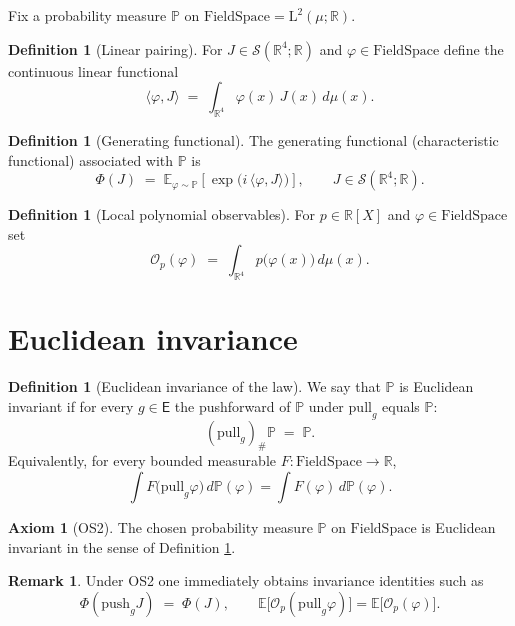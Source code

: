 \documentclass{article}
\newcommand{\R}{\mathbb{R}}
\newcommand{\Rd}{\mathbb{R}^4}
\newcommand{\1}{\mathbbm{1}}
\newcommand{\Sch}{\mathscr{S}}
\newcommand{\LP}{\mathrm{L}}
\newcommand{\push}{\mathrm{push}}
\newcommand{\pull}{\mathrm{pull}}
\newcommand{\Char}{\Phi}
\theoremstyle{plain}
\theoremstyle{definition}
\newtheorem{definition}[theorem]{Definition}
\newtheorem{axiomenv}[theorem]{Axiom}
\newtheorem{remark}[theorem]{Remark}
\numberwithin{equation}{section}
\begin{document}
Fix a probability measure $\mathbb{P}$ on $\mathrm{FieldSpace}=\LP^2(\mu;\R)$.

\begin{definition}[Linear pairing]\label{def:pairing}
For $J\in\Sch(\Rd;\R)$ and $\varphi\in\mathrm{FieldSpace}$ define the continuous linear functional
\[
\langle \varphi, J\rangle
\;=\;\int_{\Rd} \varphi(x)\, J(x)\, d\mu(x).
\]
\end{definition}

\begin{definition}[Generating functional]\label{def:genfun}
The generating functional (characteristic functional) associated with $\mathbb{P}$ is
\[
\Char(J)\;=\;\mathbb{E}_{\varphi\sim\mathbb{P}}\!\left[ \exp\bigl( i \,\langle \varphi, J\rangle \bigr)\right],
\qquad J\in\Sch(\Rd;\R).
\]
\end{definition}

\begin{definition}[Local polynomial observables]\label{def:polyobs}
For $p\in\R[X]$ and $\varphi\in\mathrm{FieldSpace}$ set
\[
\mathcal{O}_p(\varphi)\;=\;\int_{\Rd} p\bigl(\varphi(x)\bigr)\, d\mu(x).
\]
\end{definition}

\section{Euclidean invariance}

\begin{definition}[Euclidean invariance of the law]\label{def:EuclInv}
We say that $\mathbb{P}$ is Euclidean invariant if for every $g\in\mathsf{E}$ the pushforward of $\mathbb{P}$ under $\pull_g$ equals $\mathbb{P}$:
\[
(\pull_g)_\# \mathbb{P} \;=\; \mathbb{P}.
\]
Equivalently, for every bounded measurable $F:\mathrm{FieldSpace}\to\R$,
\[
\int F\bigl(\pull_g \varphi\bigr)\, d\mathbb{P}(\varphi)
= \int F(\varphi)\, d\mathbb{P}(\varphi).
\]
\end{definition}

\begin{axiomenv}[OS2]\label{ax:OS2}
The chosen probability measure $\mathbb{P}$ on $\mathrm{FieldSpace}$ is Euclidean invariant in the sense of Definition \ref{def:EuclInv}.
\end{axiomenv}

\begin{remark}
Under OS2 one immediately obtains invariance identities such as
\[
\Char(\push_g J) \;=\; \Char(J),\qquad
\mathbb{E}\bigl[\mathcal{O}_p(\pull_g \varphi)\bigr]
=\mathbb{E}\bigl[\mathcal{O}_p(\varphi)\bigr].
\]
\end{remark}
\end{document}
